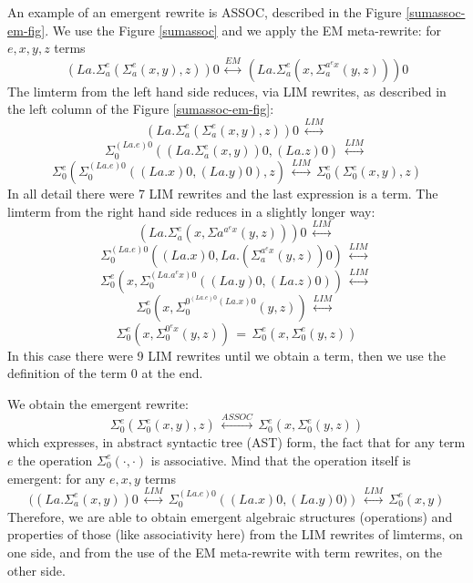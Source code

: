 \documentclass{article}
\begin{document}
An example of an emergent rewrite is ASSOC, described in the Figure \ref{sumassoc-em-fig}. We use the Figure \ref{sumassoc} and we apply the EM meta-rewrite: for $e, x, y, z$ terms 
$$ \displaystyle \left(La.\Sigma_{a}^{e}\left( \Sigma_{a}^{e}\left(x,y\right), z\right)\right) 0 \, \stackrel{EM}{\longleftrightarrow} \, \left(La.\Sigma_{a}^{e}\left( x, \Sigma_{a}^{a^{e} x} \left( y,z\right)\right)\right) 0 $$
The limterm from the left hand side reduces, via LIM rewrites, as described in the left column of the Figure \ref{sumassoc-em-fig}: 
$$ \displaystyle \left(La.\Sigma_{a}^{e}\left( \Sigma_{a}^{e}\left(x,y\right), z\right)\right) 0 \, \stackrel{LIM}{\longleftrightarrow} \, $$ 
$$ \Sigma_{0}^{(La.e)0}\left( \left( La.\Sigma_{a}^{e}\left(x,y\right)\right) 0, (La.z)0\right) \, \stackrel{LIM}{\longleftrightarrow} \, $$ 
$$\Sigma_{0}^{e}\left( \Sigma_{0}^{(La.e) 0}\left((La.x)0,(La.y)0\right), z\right) \, \stackrel{LIM}{\longleftrightarrow} \, \Sigma_{0}^{e}\left( \Sigma_{0}^{e}\left(x,y\right), z\right)$$
In all detail there were 7 LIM rewrites and the last expression is a term. The limterm from the right hand side reduces in a slightly longer way: 
$$ \displaystyle  \left(La.\Sigma_{a}^{e}\left( x, \Sigma{a}^{a^{e} x} \left( y,z\right)\right)\right) 0 \, \stackrel{LIM}{\longleftrightarrow} \, $$ 
$$\Sigma_{0}^{(La.e) 0}\left( (La.x)0, La.\left(\Sigma_{a}^{a^{e} x} \left( y,z\right)\right) 0\right) \, \stackrel{LIM}{\longleftrightarrow} \, $$ 
$$ \Sigma_{0}^{e}\left( x , \Sigma_{0}^{\left(La.a^{e} x\right) 0} \left( (La.y) 0, (La.z) 0\right)\right) \, \stackrel{LIM}{\longleftrightarrow} \, $$
$$ \Sigma_{0}^{e}\left( x , \Sigma_{0}^{0^{(La.e) 0} (La.x) 0} \left( y, z\right)\right) \, \stackrel{LIM}{\longleftrightarrow} \, $$
$$ \Sigma_{0}^{e}\left( x , \Sigma_{0}^{0^{e} x} \left( y, z\right)\right) \, = \, \Sigma_{0}^{e}\left( x , \Sigma_{0}^{e} \left( y, z\right)\right)   $$
In this case there were 9 LIM rewrites until we obtain a term, then we use the definition of the term $0$ at the end.

We obtain the emergent rewrite: 
$$\Sigma_{0}^{e}\left( \Sigma_{0}^{e}\left(x,y\right), z\right) \, \stackrel{ASSOC}{\longleftrightarrow} \, \Sigma_{0}^{e}\left( x , \Sigma_{0}^{e} \left( y, z\right)\right)   $$
which expresses, in abstract syntactic tree (AST) form, the fact that for any term $e$ the operation $\displaystyle \Sigma_{0}^{e}(\cdot, \cdot)$ is associative. Mind that the operation itself is emergent: for any $e, x, y$ terms 
$$(\left(La. \Sigma_{a}^{e}(x,y)\right) 0  \, \stackrel{LIM}{\longleftrightarrow} \, \Sigma_{0}^{(La.e) 0} \left((La.x) 0 , (La.y) 0) \right)  \, \stackrel{LIM}{\longleftrightarrow} \, \Sigma_{0}^{e}(x,y)$$
Therefore, we are able to obtain emergent algebraic structures (operations) and properties of those (like associativity here) from the LIM rewrites of limterms, on one side, and from the use of the EM meta-rewrite with term rewrites, on the other side. 
\end{document}
